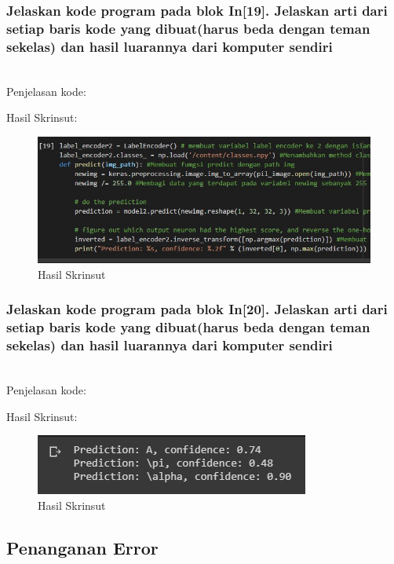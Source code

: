 \subsubsection{Jelaskan kode program pada blok  In[19]. Jelaskan arti dari setiap baris kode yang dibuat(harus beda dengan teman sekelas) dan hasil luarannya dari komputer sendiri}
\hfill\\Penjelasan kode:

Hasil Skrinsut:
\begin{figure}[H]
	\centering
	\includegraphics[scale=0.5]{figures/1174083/figures7/p19.png}
	\caption{Hasil Skrinsut}
\end{figure}


\subsubsection{Jelaskan kode program pada blok  In[20]. Jelaskan arti dari setiap baris kode yang dibuat(harus beda dengan teman sekelas) dan hasil luarannya dari komputer sendiri}
\hfill\\
Penjelasan kode:

Hasil Skrinsut:
\begin{figure}[H]
	\centering
	\includegraphics[scale=0.5]{figures/1174083/figures7/p20.png}
	\caption{Hasil Skrinsut}
\end{figure}

\subsection{Penanganan Error}

